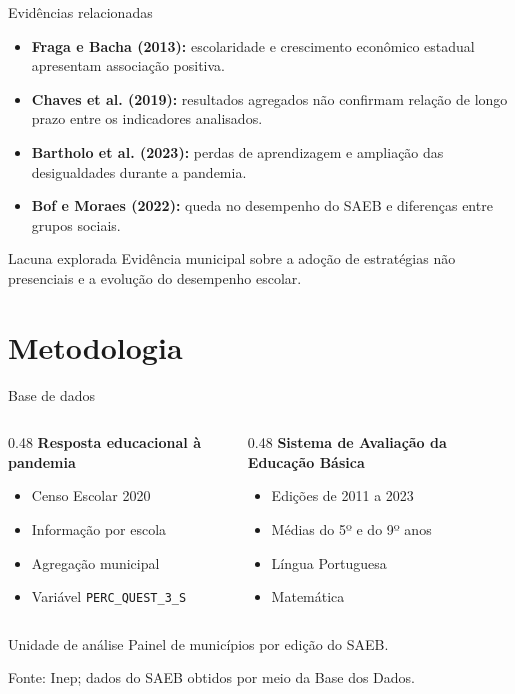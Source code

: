 \documentclass[aspectratio=169,11pt]{beamer}
\newcommand{\fonte}[1]{%
  \vfill
  {\raggedright\tiny\color{gray}Fonte: #1\par}
}
\begin{document}
\begin{frame}{Evidências relacionadas}
  \begin{itemize}
    \item \textbf{Fraga e Bacha (2013):} escolaridade e crescimento econômico estadual apresentam associação positiva.
    \item \textbf{Chaves et al. (2019):} resultados agregados não confirmam relação de longo prazo entre os indicadores analisados.
    \item \textbf{Bartholo et al. (2023):} perdas de aprendizagem e ampliação das desigualdades durante a pandemia.
    \item \textbf{Bof e Moraes (2022):} queda no desempenho do SAEB e diferenças entre grupos sociais.
  \end{itemize}

  \begin{block}{Lacuna explorada}
    Evidência municipal sobre a adoção de estratégias não presenciais e a evolução do desempenho escolar.
  \end{block}
\end{frame}

\section{Metodologia}

\begin{frame}{Base de dados}
  \begin{columns}[T]
    \begin{column}{0.48\textwidth}
      \textbf{Resposta educacional à pandemia}
      \begin{itemize}
        \item Censo Escolar 2020
        \item Informação por escola
        \item Agregação municipal
        \item Variável \texttt{PERC\_QUEST\_3\_S}
      \end{itemize}
    \end{column}
    \begin{column}{0.48\textwidth}
      \textbf{Sistema de Avaliação da Educação Básica}
      \begin{itemize}
        \item Edições de 2011 a 2023
        \item Médias do 5º e do 9º anos
        \item Língua Portuguesa
        \item Matemática
      \end{itemize}
    \end{column}
  \end{columns}

  \begin{block}{Unidade de análise}
    Painel de municípios por edição do SAEB.
  \end{block}

  \fonte{Inep; dados do SAEB obtidos por meio da Base dos Dados.}
\end{frame}
\end{document}
